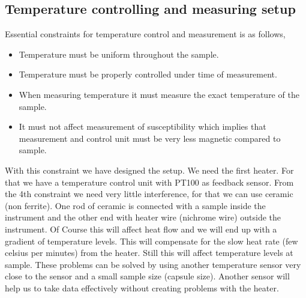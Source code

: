 \subsection{Temperature controlling and measuring setup}
Essential constraints for temperature control and measurement is as follows,
\begin{itemize}
\item Temperature must be uniform throughout the sample.\\

\item Temperature must be properly controlled under time of measurement.\\

\item When measuring temperature it must measure the exact temperature of the sample.\\

\item It must not affect measurement of susceptibility which implies that measurement and control unit must be very less magnetic compared to sample.
\end{itemize}

With this constraint we have designed the setup. We need the first heater. For that we have a temperature control unit with PT100 as feedback sensor. From the 4th constraint we need very little interference, for that we can use ceramic (non ferrite). One rod of ceramic is connected with a sample inside the instrument and the other end with heater wire (nichrome wire) outside the instrument. Of Course this will affect heat flow and we will end up with a gradient of temperature levels. This will compensate for the slow heat rate (few celsius per minutes) from the heater. Still this will affect temperature levels at sample. These problems can be solved by using another temperature sensor very close to the sensor and a small sample size (capsule size). Another sensor will help us to take data effectively without creating problems with the heater.

